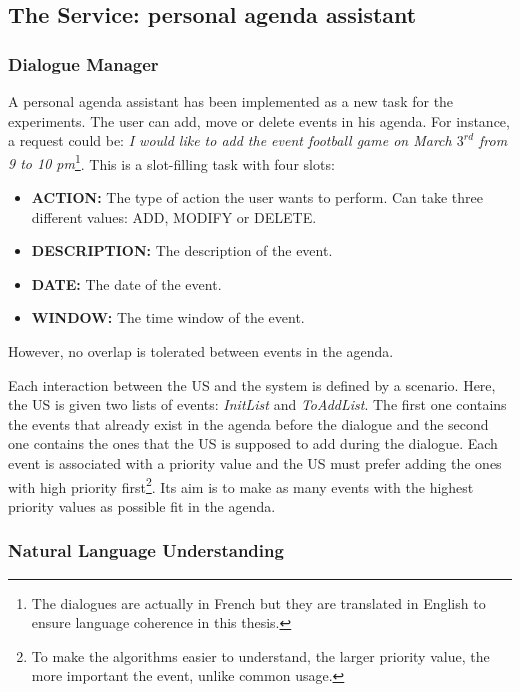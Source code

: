 	\subsection{The Service: personal agenda assistant}
        \label{subsec:service}
	
		\subsubsection{Dialogue Manager}

			A personal agenda assistant has been implemented as a new task for the experiments. The user can add, move or delete events in his agenda. For instance, a request could be: \textit{I would like to add the event football game on March $3^{rd}$ from 9 to 10 pm}\footnote{The dialogues are actually in French but they are translated in English to ensure language coherence in this thesis.}. This is a slot-filling task with four slots:
				
				\begin{itemize}
					\item \textbf{ACTION:} The type of action the user wants to perform. Can take three different values: ADD, MODIFY or DELETE.
						\item \textbf{DESCRIPTION:} The description of the event.
						\item \textbf{DATE:} The date of the event.
						\item \textbf{WINDOW:} The time window of the event.
				\end{itemize}
				
				However, no overlap is tolerated between events in the agenda.
				
				Each interaction between the US and the system is defined by a scenario. Here, the US is given two lists of events: \textit{InitList} and \textit{ToAddList}. The first one contains the events that already exist in the agenda before the dialogue and the second one contains the ones that the US is supposed to add during the dialogue. Each event is associated with a priority value and the US must prefer adding the ones with high priority first\footnote{To make the algorithms easier to understand, the larger priority value, the more important the event, unlike common usage.}. Its aim is to make as many events with the highest priority values as possible fit in the agenda.
				
		
		\subsubsection{Natural Language Understanding}
		
